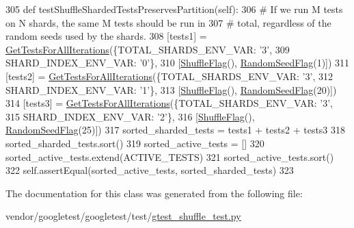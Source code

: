 \begin{DoxyCode}
305   \textcolor{keyword}{def }testShuffleShardedTestsPreservesPartition(self):
306     \textcolor{comment}{# If we run M tests on N shards, the same M tests should be run in}
307     \textcolor{comment}{# total, regardless of the random seeds used by the shards.}
308     [tests1] = \hyperlink{namespacegtest__shuffle__test_a18c7606bf0d41acb73a4a6a2994d36fc}{GetTestsForAllIterations}(\{TOTAL\_SHARDS\_ENV\_VAR: \textcolor{stringliteral}{'3'},
309                                          SHARD\_INDEX\_ENV\_VAR: \textcolor{stringliteral}{'0'}\},
310                                         [\hyperlink{namespacegtest__shuffle__test_ab593e060bf2a9b2f0cb0dc8e18eb2088}{ShuffleFlag}(), 
      \hyperlink{namespacegtest__shuffle__test_aaf2a94c748f266c4267ac7e7bb3451fd}{RandomSeedFlag}(1)])
311     [tests2] = \hyperlink{namespacegtest__shuffle__test_a18c7606bf0d41acb73a4a6a2994d36fc}{GetTestsForAllIterations}(\{TOTAL\_SHARDS\_ENV\_VAR: \textcolor{stringliteral}{'3'},
312                                          SHARD\_INDEX\_ENV\_VAR: \textcolor{stringliteral}{'1'}\},
313                                         [\hyperlink{namespacegtest__shuffle__test_ab593e060bf2a9b2f0cb0dc8e18eb2088}{ShuffleFlag}(), 
      \hyperlink{namespacegtest__shuffle__test_aaf2a94c748f266c4267ac7e7bb3451fd}{RandomSeedFlag}(20)])
314     [tests3] = \hyperlink{namespacegtest__shuffle__test_a18c7606bf0d41acb73a4a6a2994d36fc}{GetTestsForAllIterations}(\{TOTAL\_SHARDS\_ENV\_VAR: \textcolor{stringliteral}{'3'},
315                                          SHARD\_INDEX\_ENV\_VAR: \textcolor{stringliteral}{'2'}\},
316                                         [\hyperlink{namespacegtest__shuffle__test_ab593e060bf2a9b2f0cb0dc8e18eb2088}{ShuffleFlag}(), 
      \hyperlink{namespacegtest__shuffle__test_aaf2a94c748f266c4267ac7e7bb3451fd}{RandomSeedFlag}(25)])
317     sorted\_sharded\_tests = tests1 + tests2 + tests3
318     sorted\_sharded\_tests.sort()
319     sorted\_active\_tests = []
320     sorted\_active\_tests.extend(ACTIVE\_TESTS)
321     sorted\_active\_tests.sort()
322     self.assertEqual(sorted\_active\_tests, sorted\_sharded\_tests)
323 
\end{DoxyCode}


The documentation for this class was generated from the following file\+:\begin{DoxyCompactItemize}
\item 
vendor/googletest/googletest/test/\hyperlink{gtest__shuffle__test_8py}{gtest\+\_\+shuffle\+\_\+test.\+py}\end{DoxyCompactItemize}
